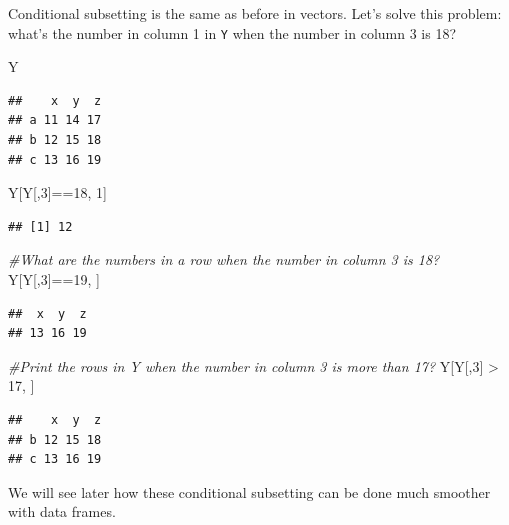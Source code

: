 \documentclass[
]{book}
\newenvironment{Shaded}{\begin{snugshade}}{\end{snugshade}}
\newcommand{\CommentTok}[1]{\textcolor[rgb]{0.56,0.35,0.01}{\textit{#1}}}
\newcommand{\DecValTok}[1]{\textcolor[rgb]{0.00,0.00,0.81}{#1}}
\newcommand{\NormalTok}[1]{#1}
\newcommand{\SpecialCharTok}[1]{\textcolor[rgb]{0.00,0.00,0.00}{#1}}
\begin{document}
Conditional subsetting is the same as before in vectors. Let's solve this problem: what's the number in column 1 in \texttt{Y} when the number in column 3 is 18?

\begin{Shaded}
\begin{Highlighting}[]
\NormalTok{Y}
\end{Highlighting}
\end{Shaded}

\begin{verbatim}
##    x  y  z
## a 11 14 17
## b 12 15 18
## c 13 16 19
\end{verbatim}

\begin{Shaded}
\begin{Highlighting}[]
\NormalTok{Y[Y[,}\DecValTok{3}\NormalTok{]}\SpecialCharTok{==}\DecValTok{18}\NormalTok{, }\DecValTok{1}\NormalTok{]}
\end{Highlighting}
\end{Shaded}

\begin{verbatim}
## [1] 12
\end{verbatim}

\begin{Shaded}
\begin{Highlighting}[]
\CommentTok{\#What are the numbers in a row when the number in column 3 is 18?}
\NormalTok{Y[Y[,}\DecValTok{3}\NormalTok{]}\SpecialCharTok{==}\DecValTok{19}\NormalTok{, ]}
\end{Highlighting}
\end{Shaded}

\begin{verbatim}
##  x  y  z 
## 13 16 19
\end{verbatim}

\begin{Shaded}
\begin{Highlighting}[]
\CommentTok{\#Print the rows in Y when the number in column 3 is more than 17?}
\NormalTok{Y[Y[,}\DecValTok{3}\NormalTok{] }\SpecialCharTok{\textgreater{}} \DecValTok{17}\NormalTok{, ]}
\end{Highlighting}
\end{Shaded}

\begin{verbatim}
##    x  y  z
## b 12 15 18
## c 13 16 19
\end{verbatim}

We will see later how these conditional subsetting can be done much smoother with data frames.
\end{document}
